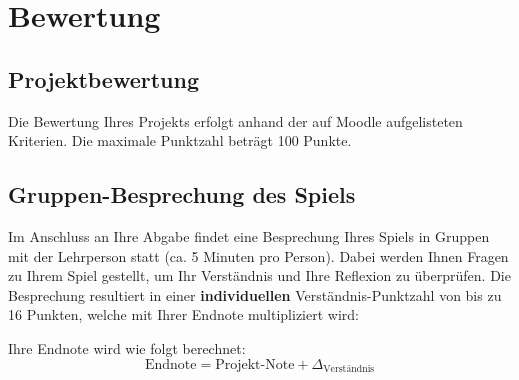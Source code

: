 
\section{Bewertung}
\subsection{Projektbewertung}
Die Bewertung Ihres Projekts erfolgt anhand der auf Moodle aufgelisteten Kriterien. Die maximale Punktzahl beträgt 100 Punkte.

\subsection{Gruppen-Besprechung des Spiels}

Im Anschluss an Ihre Abgabe findet eine Besprechung Ihres Spiels in Gruppen mit der Lehrperson statt (ca. 5 Minuten pro Person). Dabei werden Ihnen Fragen zu Ihrem Spiel gestellt, um Ihr Verständnis und Ihre Reflexion zu überprüfen. Die Besprechung resultiert in einer \textbf{individuellen} Verständnis-Punktzahl von bis zu 16 Punkten, welche mit Ihrer Endnote multipliziert wird:

Ihre Endnote wird wie folgt berechnet:
\[\text{Endnote} = \text{Projekt-Note} + \Delta_{\text{Verständnis}}\]

